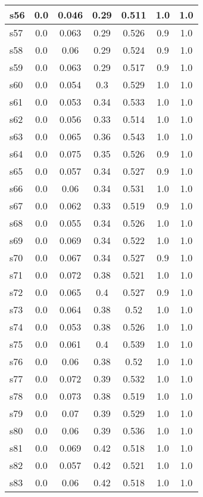 \documentclass{article}
\begin{document}
\begin{tabular}{|l|c|c|c|c|c|c|}
\hline
s56 &0.0 & 0.046 & 0.29 & 0.511 & 1.0 & 1.0\\
\hline
s57 &0.0 & 0.063 & 0.29 & 0.526 & 0.9 & 1.0\\
\hline
s58 &0.0 & 0.06 & 0.29 & 0.524 & 0.9 & 1.0\\
\hline
s59 &0.0 & 0.063 & 0.29 & 0.517 & 0.9 & 1.0\\
\hline
s60 &0.0 & 0.054 & 0.3 & 0.529 & 1.0 & 1.0\\
\hline
s61 &0.0 & 0.053 & 0.34 & 0.533 & 1.0 & 1.0\\
\hline
s62 &0.0 & 0.056 & 0.33 & 0.514 & 1.0 & 1.0\\
\hline
s63 &0.0 & 0.065 & 0.36 & 0.543 & 1.0 & 1.0\\
\hline
s64 &0.0 & 0.075 & 0.35 & 0.526 & 0.9 & 1.0\\
\hline
s65 &0.0 & 0.057 & 0.34 & 0.527 & 0.9 & 1.0\\
\hline
s66 &0.0 & 0.06 & 0.34 & 0.531 & 1.0 & 1.0\\
\hline
s67 &0.0 & 0.062 & 0.33 & 0.519 & 0.9 & 1.0\\
\hline
s68 &0.0 & 0.055 & 0.34 & 0.526 & 1.0 & 1.0\\
\hline
s69 &0.0 & 0.069 & 0.34 & 0.522 & 1.0 & 1.0\\
\hline
s70 &0.0 & 0.067 & 0.34 & 0.527 & 0.9 & 1.0\\
\hline
s71 &0.0 & 0.072 & 0.38 & 0.521 & 1.0 & 1.0\\
\hline
s72 &0.0 & 0.065 & 0.4 & 0.527 & 0.9 & 1.0\\
\hline
s73 &0.0 & 0.064 & 0.38 & 0.52 & 1.0 & 1.0\\
\hline
s74 &0.0 & 0.053 & 0.38 & 0.526 & 1.0 & 1.0\\
\hline
s75 &0.0 & 0.061 & 0.4 & 0.539 & 1.0 & 1.0\\
\hline
s76 &0.0 & 0.06 & 0.38 & 0.52 & 1.0 & 1.0\\
\hline
s77 &0.0 & 0.072 & 0.39 & 0.532 & 1.0 & 1.0\\
\hline
s78 &0.0 & 0.073 & 0.38 & 0.519 & 1.0 & 1.0\\
\hline
s79 &0.0 & 0.07 & 0.39 & 0.529 & 1.0 & 1.0\\
\hline
s80 &0.0 & 0.06 & 0.39 & 0.536 & 1.0 & 1.0\\
\hline
s81 &0.0 & 0.069 & 0.42 & 0.518 & 1.0 & 1.0\\
\hline
s82 &0.0 & 0.057 & 0.42 & 0.521 & 1.0 & 1.0\\
\hline
s83 &0.0 & 0.06 & 0.42 & 0.518 & 1.0 & 1.0\\
\hline

\end{tabular}
\end{document}
